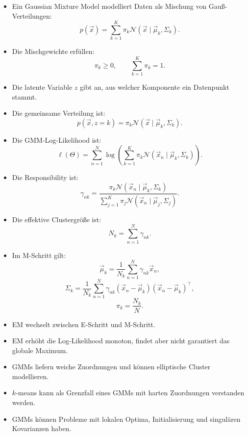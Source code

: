 \begin{itemize}
    \item Ein Gaussian Mixture Model modelliert Daten als Mischung von Gauß-Verteilungen:
    \[
        p(\vec{x})
        =
        \sum_{k=1}^{K}
        \pi_k
        \mathcal{N}(\vec{x}\mid\vec{\mu}_k,\Sigma_k).
    \]
    \item Die Mischgewichte erfüllen:
    \[
        \pi_k\geq 0,
        \qquad
        \sum_{k=1}^{K}\pi_k=1.
    \]
    \item Die latente Variable \(z\) gibt an, aus welcher Komponente ein Datenpunkt stammt.
    \item Die gemeinsame Verteilung ist:
    \[
        p(\vec{x},z=k)
        =
        \pi_k
        \mathcal{N}(\vec{x}\mid\vec{\mu}_k,\Sigma_k).
    \]
    \item Die GMM-Log-Likelihood ist:
    \[
        \ell(\Theta)
        =
        \sum_{n=1}^{N}
        \log
        \left(
            \sum_{k=1}^{K}
            \pi_k
            \mathcal{N}(\vec{x}_n\mid\vec{\mu}_k,\Sigma_k)
        \right).
    \]
    \item Die Responsibility ist:
    \[
        \gamma_{nk}
        =
        \frac{
            \pi_k
            \mathcal{N}(\vec{x}_n\mid\vec{\mu}_k,\Sigma_k)
        }{
            \sum_{j=1}^{K}
            \pi_j
            \mathcal{N}(\vec{x}_n\mid\vec{\mu}_j,\Sigma_j)
        }.
    \]
    \item Die effektive Clustergröße ist:
    \[
        N_k
        =
        \sum_{n=1}^{N}
        \gamma_{nk}.
    \]
    \item Im M-Schritt gilt:
    \[
        \vec{\mu}_k
        =
        \frac{1}{N_k}
        \sum_{n=1}^{N}
        \gamma_{nk}\vec{x}_n,
    \]
    \[
        \Sigma_k
        =
        \frac{1}{N_k}
        \sum_{n=1}^{N}
        \gamma_{nk}
        (\vec{x}_n-\vec{\mu}_k)
        (\vec{x}_n-\vec{\mu}_k)^{\top},
    \]
    \[
        \pi_k
        =
        \frac{N_k}{N}.
    \]
    \item EM wechselt zwischen E-Schritt und M-Schritt.
    \item EM erhöht die Log-Likelihood monoton, findet aber nicht garantiert das globale Maximum.
    \item GMMs liefern weiche Zuordnungen und können elliptische Cluster modellieren.
    \item \(k\)-means kann als Grenzfall eines GMMs mit harten Zuordnungen verstanden werden.
    \item GMMs können Probleme mit lokalen Optima, Initialisierung und singulären Kovarianzen haben.
\end{itemize}


